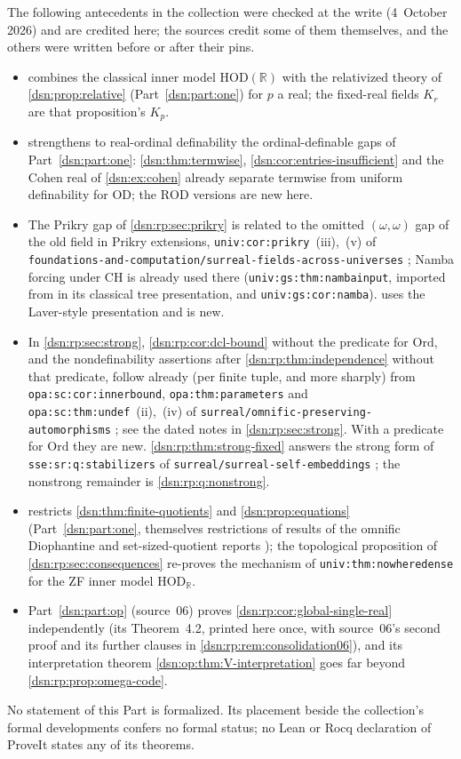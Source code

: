 \documentclass[11pt,a4paper]{article}
\numberwithin{equation}{section}
\theoremstyle{definition}
\theoremstyle{remark}
\newcommand{\Ord}{\mathrm{Ord}}
\newcommand{\OD}{\mathrm{OD}}
\newcommand{\HOD}{\mathrm{HOD}}
\newcommand{\R}{\mathbb R}
\newcommand{\repopath}[1]{\nolinkurl{#1}}
\newcommand{\lbl}[1]{\nolinkurl{#1}}
\newcommand{\ROD}{\mathrm{ROD}}
\newcommand{\HR}{\HOD_{\R}}
\begin{document}
The following antecedents in the collection were checked at the write
(4~October 2026) and are credited here; the sources credit some of them
themselves, and the others were written before or after their pins.
\begin{itemize}
\item {} combines the classical inner
model $\HOD(\R)$ with the relativized theory of
\cref{dsn:prop:relative} (Part~\ref{dsn:part:one}) for $p$ a real; the
fixed-real fields $K_r$ are that proposition's $K_p$.
\item {} strengthens to real-ordinal definability
the ordinal-definable gaps of Part~\ref{dsn:part:one}:
\cref{dsn:thm:termwise}, \cref{dsn:cor:entries-insufficient} and the Cohen
real of \cref{dsn:ex:cohen} already separate termwise from uniform
definability for $\OD$; the $\ROD$ versions are new here.
\item The Prikry gap of \cref{dsn:rp:sec:prikry} is related to the
omitted $(\omega,\omega)$ gap of the old field in Prikry extensions,
\lbl{univ:cor:prikry}~(iii),~(v) of
\repopath{foundations-and-computation/surreal-fields-across-universes}
\cite{RepoUniv}; Namba forcing under CH is already used there
(\lbl{univ:gs:thm:nambainput}, imported from \cite[Section~7.6]{FKW} in
its classical tree presentation, and \lbl{univ:gs:cor:namba}).
 uses the Laver-style presentation and is new.
\item In \cref{dsn:rp:sec:strong}, \cref{dsn:rp:cor:dcl-bound} without
the predicate for $\Ord$, and the nondefinability assertions after
\cref{dsn:rp:thm:independence} without that predicate, follow already
(per finite tuple, and more sharply) from
\lbl{opa:sc:cor:innerbound}, \lbl{opa:thm:parameters} and
\lbl{opa:sc:thm:undef}~(ii),~(iv) of
\repopath{surreal/omnific-preserving-automorphisms} \cite{RepoOpa}; see the
dated notes in \cref{dsn:rp:sec:strong}. With a predicate for $\Ord$ they are new.
\cref{dsn:rp:thm:strong-fixed} answers the strong form of
\lbl{sse:sr:q:stabilizers} of \repopath{surreal/surreal-self-embeddings}
\cite{RepoSse}; the nonstrong remainder is \cref{dsn:rp:q:nonstrong}.
\item {} restricts
\cref{dsn:thm:finite-quotients} and \cref{dsn:prop:equations}
(Part~\ref{dsn:part:one}, themselves restrictions of results of the
omnific Diophantine and set-sized-quotient reports
\cite{RepoOdg,RepoOsq}); the topological proposition of
\cref{dsn:rp:sec:consequences} re-proves the mechanism of
\lbl{univ:thm:nowheredense} for the ZF inner model $\HR$.
\item Part~\ref{dsn:part:op} (source~06) proves
\cref{dsn:rp:cor:global-single-real} independently (its Theorem~4.2,
printed here once, with source~06's second proof and its further
clauses in \cref{dsn:rp:rem:consolidation06}), and its interpretation
theorem \cref{dsn:op:thm:V-interpretation} goes far beyond
\cref{dsn:rp:prop:omega-code}.
\end{itemize}
No statement of this Part is formalized. Its placement beside the
collection's formal developments confers no formal status; no Lean or Rocq
declaration of ProveIt states any of its theorems.
\end{document}
